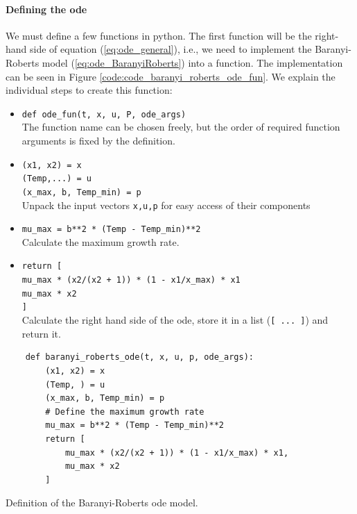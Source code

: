 \documentclass[10pt,A4paper]{article}
\begin{document}
\paragraph{Defining the \acs{ode}} 
We must define a few functions in python.
The first function will be the right-hand side of equation (\ref{eq:ode_general}), i.e., we need to implement the Baranyi-Roberts model (\ref{eq:ode_BaranyiRoberts}) into a function. 
The implementation can be seen in Figure \ref{code:code_baranyi_roberts_ode_fun}.
We explain the individual steps to create this function:
\begin{itemize}
\item  \texttt{def ode_fun(t, x, u, P, ode_args)}\\
The function name can be chosen freely, but the order of required function arguments is fixed by the definition.  
\item \texttt{(x1, x2) = x}\\
\texttt{(Temp,...) = u}\\
\texttt{(x_max, b, Temp_min) = p}\\
Unpack the input vectors \texttt{x,u,p} for easy access of their components
\item \texttt{mu_max = b**2 * (Temp - Temp_min)**2}\\
Calculate the maximum growth rate.
\item \texttt{return [}\\
    \texttt{mu_max * (x2/(x2 + 1)) * (1 - x1/x_max) * x1}\\
    \texttt{mu_max * x2}\\
    \texttt{]}\\
Calculate the right hand side of the \acs{ode}, store it in a list (\texttt{[ ... ]}) and return it.
\end{itemize}

\begin{code}[h]
    \begin{verbatim}
    def baranyi_roberts_ode(t, x, u, p, ode_args):
        (x1, x2) = x
        (Temp, ) = u
        (x_max, b, Temp_min) = p
        # Define the maximum growth rate
        mu_max = b**2 * (Temp - Temp_min)**2
        return [
            mu_max * (x2/(x2 + 1)) * (1 - x1/x_max) * x1,
            mu_max * x2
        ]
    \end{verbatim}
    \caption{Definition of the Baranyi-Roberts \ac{ode} model.}
    \label{code:code_baranyi_roberts_ode_fun}
\end{code}
%
\end{document}
